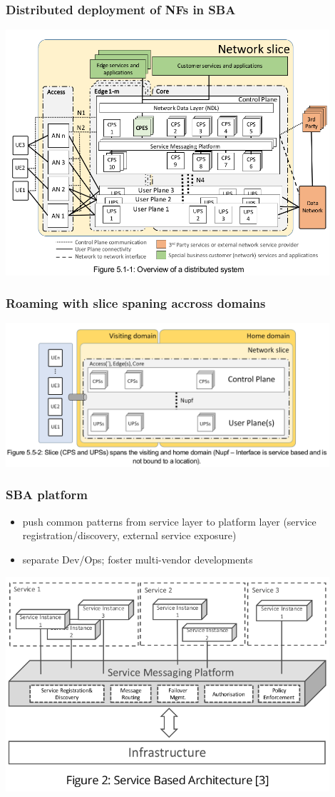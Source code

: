 \documentclass{beamer}
\begin{document}
\begin{frame}
  \frametitle{Distributed deployment of NFs in SBA}
  \center
  \includegraphics[width=0.9\textwidth]{images/distributed-sba}
\end{frame}

\begin{frame}
  \frametitle{Roaming with slice spaning accross domains}
  \center
  \includegraphics[width=0.9\textwidth]{images/sba-roaming}
\end{frame}



\begin{frame}
  \frametitle{SBA platform}
  \begin{itemize}
    \item push common patterns from service layer to platform layer (service registration/discovery, external service exposure)
    \item {separate Dev/Ops; foster multi-vendor developments}
  \end{itemize}
  \center
  \includegraphics[width=0.9\textwidth]{images/cn-sba}
\end{frame}
\end{document}
